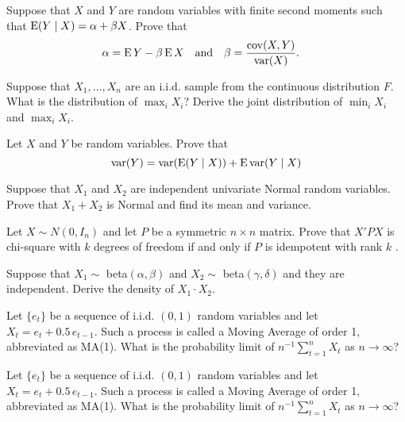 \begin{hw}
  Suppose that $X$ and $Y$ are random variables with finite second
  moments such that $\operatorname{E}(Y \mid X) = \alpha + \beta X$. Prove that
  \begin{align}
    \alpha &= \operatorname{E} Y - \beta \operatorname{E} X &\text{and}&& \beta &= \frac{\operatorname{cov}(X, Y)}{\operatorname{var}(X)}.
  \end{align}
\end{hw}

\begin{hw}
  Suppose that $X_1,\dots,X_n$ are an i.i.d. sample from the continuous
  distribution $F$. What is the distribution of $\max_i X_i$? Derive
  the joint distribution of $\min_i X_i$ and $\max_i X_i$.
\end{hw}

\begin{hw}
  Let $X$ and $Y$ be random variables. Prove that 
  \begin{equation}
    \operatorname{var}(Y) = \operatorname{var}(\operatorname{E}(Y \mid X)) + \operatorname{E} \operatorname{var}(Y \mid X)
  \end{equation}
\end{hw}

\begin{hw}
  Suppose that $X_1$ and $X_2$ are independent univariate Normal
  random variables. Prove that $X_1 + X_2$ is Normal and find its mean
  and variance.
\end{hw}

\begin{hw}
  Let $X \sim N(0,I_n)$ and let $P$ be a symmetric $n \times n$ matrix.
  Prove that $X'PX$ is chi-square with $k$ degrees of freedom if and
  only if $P$ is idempotent with rank $k$ \citep{SL03}.
\end{hw}

\begin{hw}
  Suppose that $X_1 \sim$ beta$(\alpha, \beta)$ and $X_2 \sim$ beta$(\gamma, \delta)$ and
  they are independent. Derive the density of $X_1 \cdot X_2$.
\end{hw}

\begin{hw}
  Let $\{e_t\}$ be a sequence of i.i.d. $(0,1)$ random variables
  and let $X_t = e_t + 0.5\, e_{t-1}$. Such a process is called a
  Moving Average of order 1, abbreviated as MA(1). What is the
  probability limit of $n^{-1} \sum_{t=1}^n X_t$ as $n \to \infty$?
\end{hw}

\begin{hw}
  Let $\{e_t\}$ be a sequence of i.i.d. $(0,1)$ random variables
  and let $X_t = e_t + 0.5\, e_{t-1}$. Such a process is called a
  Moving Average of order 1, abbreviated as MA(1). What is the
  probability limit of $n^{-1} \sum_{t=1}^n X_t$ as $n \to \infty$?
\end{hw}

